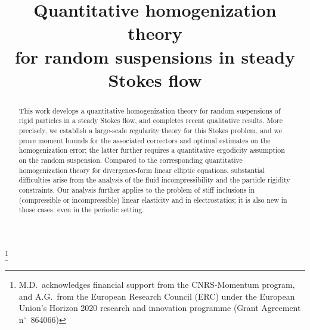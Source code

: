 \documentclass[JEP,XML,SOM,Unicode,published]{cedram}
\newcounter{assumption}
\theoremstyle{plain}
\theoremstyle{definition}
\begin{document}
\title[Quantitative homogenization of random suspensions]{Quantitative homogenization theory\\for random suspensions in steady Stokes flow}

\author[\initial{M.} \lastname{Duerinckx}]{ }
\address{Université Paris-Saclay, CNRS, Laboratoire de Mathématiques d'Orsay\\
91400~Orsay, France\\
\& University of California, Los Angeles, Department of Mathematics\\
Los Angeles CA 90095, USA\\
\& Université Libre de Bruxelles, Département de Mathématique\\
1050~Brussels, Belgium}
\urladdr{}

\author[\initial{A.} \lastname{Gloria}]{ }
\address{Sorbonne Université, CNRS, Université de Paris, Laboratoire Jacques-Louis Lions\\
75005~Paris, France\\
\& Institut Universitaire de France\\
\& Université Libre de Bruxelles, Département de Mathématique\\
1050~Brussels, Belgium}

\thanks{M.D.\ acknowledges financial support from the CNRS-Momentum program, and A.G.\ from the European Research Council (ERC) under the European Union's Horizon 2020 research and innovation programme (Grant Agreement n$^\circ$~864066)}

\begin{abstract}
This work develops a quantitative homogenization theory for random suspensions of rigid particles in a steady Stokes flow, and completes recent qualitative results. More precisely, we establish a large-scale regularity theory for this Stokes problem, and we prove moment bounds for the associated correctors and optimal estimates on the homogenization error; the latter further requires a quantitative ergodicity assumption on the random suspension. Compared to the corresponding quantitative homogenization theory for divergence-form linear elliptic equations, substantial difficulties arise from the analysis of the fluid incompressibility and the particle rigidity constraints.
Our analysis further applies to the problem of stiff inclusions in (compressible or incompressible) linear elasticity and in electrostatics; it is also new in those cases, even in the periodic setting.
\end{abstract}
\end{document}
